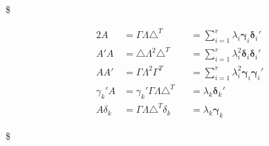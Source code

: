 \documentclass[
]{book}
\begin{document}
{{{\$

\begin{alignat}{2}




A &= \Gamma \Lambda \triangle^T 

&&=\sum_{i=1}^r \lambda_i \pmb \gamma_i \pmb \delta_i '


\\

A'A &= \triangle \Lambda^2 \triangle^T

&&=\sum_{i=1}^r \lambda_i^2 \pmb \delta_i \pmb \delta_i '

\\

AA'&= \Gamma \Lambda^2 \Gamma^T

&&=\sum_{i=1}^r \lambda_i^2 \pmb \gamma_i \pmb \gamma_i '


\\

\gamma_k ' A 

&=  \gamma_k ' \Gamma \Lambda \triangle^T 

&&= \lambda_k \pmb \delta_k '





\\

A \delta_k 

&=  \Gamma \Lambda \triangle^T  \delta_k  

&&= \lambda_k \pmb \gamma_k 


\end{alignat}

\$

}}}
\end{document}

